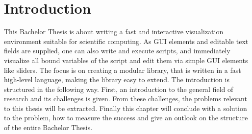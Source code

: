 \section{Introduction}
This Bachelor Thesis is about writing a fast and interactive visualization environment suitable for scientific computing. 
As GUI elements and editable text fields are supplied, one can also write and execute scripts, and immediately visualize all bound variables of the script and edit them via simple GUI elements like sliders. The focus is on creating a modular library, that is written in a fast high-level language, making the library easy to extend.
The introduction is structured in the following way.
First, an introduction to the general field of research and its challenges is given. 
From these challenges, the problems relevant to this thesis will be extracted.
Finally this chapter will conclude with a solution to the problem, how to measure the success and give an outlook on the structure of the entire Bachelor Thesis.
 
